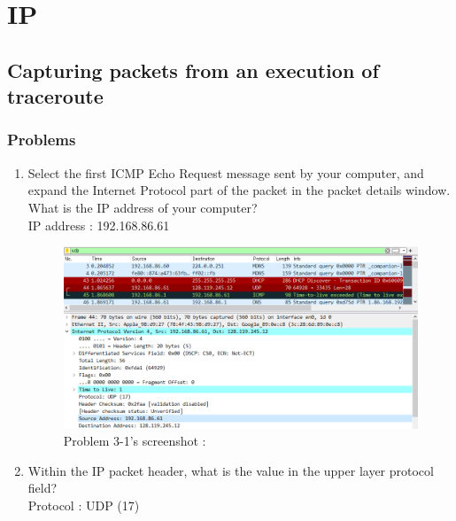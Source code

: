 \section{IP}
\subsection{Capturing packets from an execution of traceroute}
    \subsubsection*{Problems}
    \begin{enumerate}[label=\bfseries Problem \arabic*:,leftmargin=*,labelindent=1em]
        \item Select the first ICMP Echo Request message sent by your computer, 
        and expand the Internet Protocol part of the packet in the packet details window.
        What is the IP address of your computer?\\[0.2mm]
        \soln IP address : 192.168.86.61
        \begin{figure}[!h]\centering
        \hspace{15mm}  
    		\includegraphics[width=.85\textwidth]{image/week02/3-1-1.png}
    		\caption{\footnotesize Problem 3-1's screenshot : }
    		\vspace{-10pt}
        \end{figure}
        \item Within the IP packet header, what is the value in the upper layer protocol field?\\[0.2mm]
        \soln Protocol : UDP (17)
        \begin{figure}[!h]\centering
        \hspace{15mm}  

\end{figure}
\end{enumerate}
